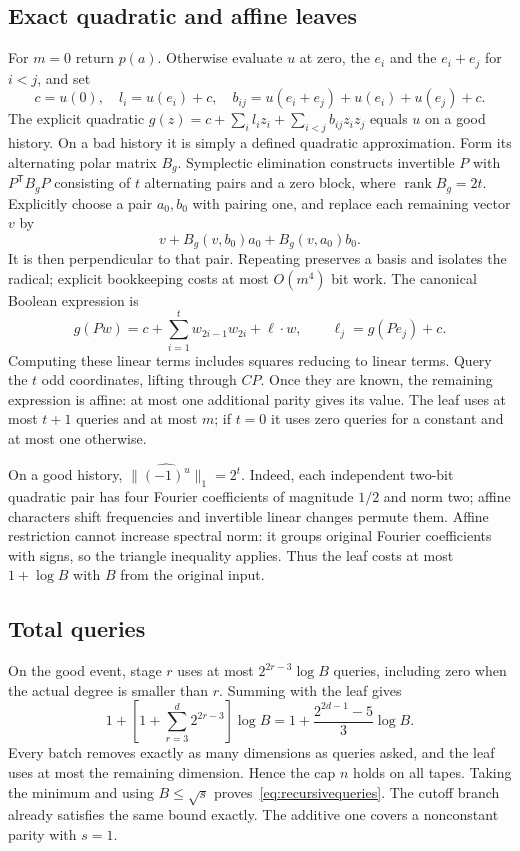 \documentclass[11pt]{article}
\theoremstyle{remark}\newtheorem{remark}[theorem]{Remark}
\newcommand{\rank}{\operatorname{rank}}
\begin{document}
\subsection{Exact quadratic and affine leaves}\label{sec:leaf}
For $m=0$ return $p(a)$. Otherwise evaluate $u$ at zero, the $e_i$ and the $e_i+e_j$ for $i<j$, and set
\[
 c=u(0),\quad l_i=u(e_i)+c,\quad
 b_{ij}=u(e_i+e_j)+u(e_i)+u(e_j)+c.
\]
The explicit quadratic $g(z)=c+\sum_i l_i z_i+\sum_{i<j}b_{ij}z_iz_j$ equals $u$ on a good history. On a bad history it is simply a defined quadratic approximation. Form its alternating polar matrix $B_g$. Symplectic elimination constructs invertible $P$ with $P^\mathsf{T}B_gP$ consisting of $t$ alternating pairs and a zero block, where $\rank B_g=2t$. Explicitly choose a pair $a_0,b_0$ with pairing one, and replace each remaining vector $v$ by
\[
 v+B_g(v,b_0)a_0+B_g(v,a_0)b_0.
\]
It is then perpendicular to that pair. Repeating preserves a basis and isolates the radical; explicit bookkeeping costs at most $O(m^4)$ bit work. The canonical Boolean expression is
\[
 g(Pw)=c+\sum_{i=1}^t w_{2i-1}w_{2i}+\ell\cdot w,
 \qquad \ell_j=g(Pe_j)+c.
\]
Computing these linear terms includes squares reducing to linear terms. Query the $t$ odd coordinates, lifting through $CP$. Once they are known, the remaining expression is affine: at most one additional parity gives its value. The leaf uses at most $t+1$ queries and at most $m$; if $t=0$ it uses zero queries for a constant and at most one otherwise.

On a good history, $\|\widehat{(-1)^u}\|_1=2^t$. Indeed, each independent two-bit quadratic pair has four Fourier coefficients of magnitude $1/2$ and norm two; affine characters shift frequencies and invertible linear changes permute them. Affine restriction cannot increase spectral norm: it groups original Fourier coefficients with signs, so the triangle inequality applies. Thus the leaf costs at most $1+\log B$ with $B$ from the original input.

\subsection{Total queries}
On the good event, stage $r$ uses at most $2^{2r-3}\log B$ queries, including zero when the actual degree is smaller than $r$. Summing with the leaf gives
\[
 1+\left[1+\sum_{r=3}^d2^{2r-3}\right]\log B
 =1+\frac{2^{2d-1}-5}{3}\log B.
\]
Every batch removes exactly as many dimensions as queries asked, and the leaf uses at most the remaining dimension. Hence the cap $n$ holds on all tapes. Taking the minimum and using $B\le\sqrt{s}$ proves~\eqref{eq:recursivequeries}. The cutoff branch already satisfies the same bound exactly. The additive one covers a nonconstant parity with $s=1$.
\end{document}
